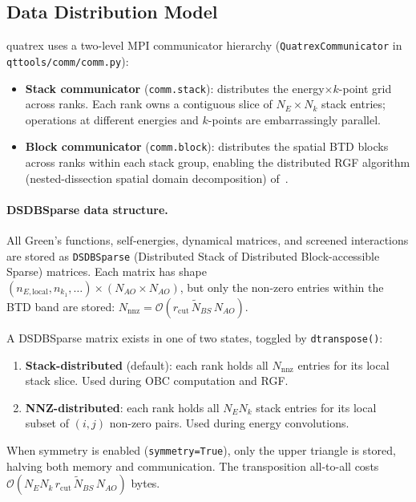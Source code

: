 \subsection{Data Distribution Model}
\label{sec:data_distribution}

quatrex uses a two-level MPI communicator hierarchy
(\texttt{QuatrexCommunicator} in \\\texttt{qttools/comm/comm.py}):
\begin{itemize}
  \item \textbf{Stack communicator} (\texttt{comm.stack}): distributes
        the energy$\times k$-point grid across ranks.  Each rank owns a
        contiguous slice of $N_E\times N_k$ stack entries; operations at
        different energies and $k$-points are embarrassingly parallel.
  \item \textbf{Block communicator} (\texttt{comm.block}): distributes
        the spatial BTD blocks across ranks within each stack group,
        enabling the distributed RGF algorithm (nested-dissection
        spatial domain decomposition) of~\cite{vetsch_ab-initio_2025}.
\end{itemize}

\paragraph{DSDBSparse data structure.}
All Green's functions, self-energies, dynamical matrices, and screened
interactions are stored as \texttt{DSDBSparse} (Distributed Stack of
Distributed Block-accessible Sparse) matrices.  Each matrix has shape
\\$(n_{E,\text{local}}, n_{k_1},\ldots)\times(N_{AO}\times N_{AO})$,
but only the non-zero entries within the BTD band are stored:
$N_\mathrm{nnz} = \mathcal{O}(r_\mathrm{cut}\,\widetilde{N}_{BS}\,N_{AO})$.

A DSDBSparse matrix exists in one of two states, toggled by
\texttt{dtranspose()}:
\begin{enumerate}
  \item \textbf{Stack-distributed} (default): each rank holds all
        $N_\mathrm{nnz}$ entries for its local stack slice.  Used
        during OBC computation and RGF.
  \item \textbf{NNZ-distributed}: each rank holds all $N_E N_k$ stack
        entries for its local subset of $(i,j)$ non-zero pairs.  Used
        during energy convolutions.
\end{enumerate}
When symmetry is enabled (\texttt{symmetry=True}), only the upper
triangle is stored, halving both memory and communication.  The
transposition all-to-all costs
$\mathcal{O}(N_E N_k\,r_\mathrm{cut}\,\widetilde{N}_{BS}\,N_{AO})$
bytes.


